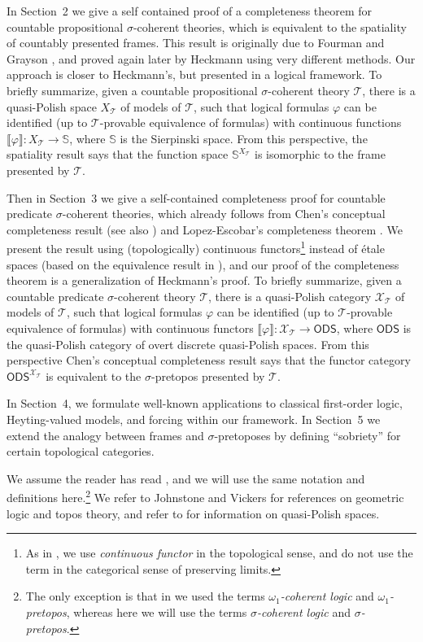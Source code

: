 \documentclass{article}
\theoremstyle{plain}
\def\cal#1{{\mathcal #1}}
\def\sierp{{\mathbb S}}
\def\calT{{\cal T}}
\def\calX{{\cal X}}
\newcommand{\ODS}{{\mathsf{ODS}}}
\begin{document}
In Section~2 we give a self contained proof of a completeness theorem for countable propositional $\sigma$-coherent theories, which is equivalent to the spatiality of countably presented frames. This result is originally due to Fourman and Grayson \cite{FG82}, and proved again later by Heckmann \cite{H15} using very different methods. Our approach is closer to Heckmann's, but presented in a logical framework. To briefly summarize, given a countable propositional $\sigma$-coherent theory $\calT$, there is a quasi-Polish space $X_\calT$ of models of $\calT$, such that logical formulas $\varphi$ can be identified (up to $\calT$-provable equivalence of formulas) with continuous functions $\llbracket \varphi\rrbracket \colon X_\calT \to \sierp$, where $\sierp$ is the Sierpinski space. From this perspective, the spatiality result says that the function space $\sierp^{X_\calT}$ is isomorphic to the frame presented by $\calT$.

Then in Section~3 we give a self-contained completeness proof for countable predicate $\sigma$-coherent theories, which already follows from Chen's conceptual completeness result \cite{Chen19} (see also \cite{Chen25}) and Lopez-Escobar's completeness theorem \cite{LE65}. We present the result using (topologically) continuous functors\footnote{As in \cite{dbr26}, we use \emph{continuous functor} in the topological sense, and do not use the term in the categorical sense of preserving limits.} instead of  \'{e}tale spaces (based on the equivalence result in \cite{dbr26}), and our proof of the completeness theorem is a generalization of Heckmann's proof. To briefly summarize, given a countable predicate $\sigma$-coherent theory $\calT$, there is a quasi-Polish category $\calX_\calT$ of models of $\calT$, such that logical formulas $\varphi$ can be identified (up to $\calT$-provable equivalence of formulas) with continuous functors $\llbracket \varphi\rrbracket \colon \calX_\calT \to \ODS$, where $\ODS$ is the quasi-Polish category of overt discrete quasi-Polish spaces. From this perspective Chen's conceptual completeness result says that the functor category $\ODS^{\calX_\calT}$ is equivalent to the $\sigma$-pretopos presented by $\calT$. 

In Section~4, we formulate well-known applications to classical first-order logic, Heyting-valued models, and forcing within our framework. In Section~5 we extend the analogy between frames and $\sigma$-pretoposes by defining ``sobriety'' for certain topological categories.

We assume the reader has read \cite{dbr26}, and we will use the same notation and definitions here.\footnote{The only exception is that in \cite{dbr26} we used the terms \emph{$\omega_1$-coherent logic} and \emph{$\omega_1$-pretopos}, whereas here we will use the terms \emph{$\sigma$-coherent logic} and \emph{$\sigma$-pretopos}. } We refer to Johnstone \cite{J02} and Vickers \cite{V07} for references on geometric logic and topos theory, and refer to \cite{dbr,dbr20} for information on quasi-Polish spaces.
\end{document}
